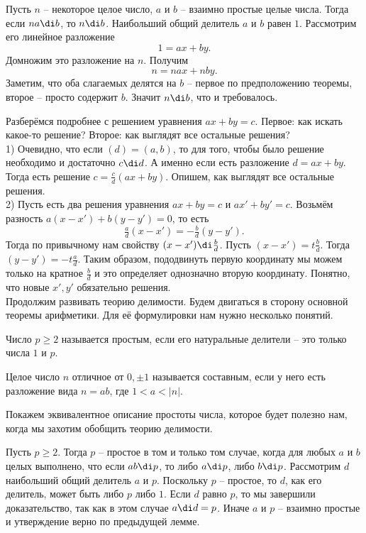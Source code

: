 \lm Пусть $n$ -- некоторое целое число, $a$ и $b$ -- взаимно простые целые числа. Тогда если $na \di b$, то $n\di b$.
\elm
\proof Наибольший общий делитель $a$  и $b$ равен $1$. Рассмотрим его линейное разложение 
$$1=ax+by.$$
Домножим это разложение на $n$. Получим $$n=nax+nby.$$
Заметим, что оба слагаемых делятся на $b$ -- первое по предположению теоремы, второе -- просто содержит $b$. Значит $n \di b$, что и требовалось.
\endproof

Разберёмся подробнее с решением уравнения $ax+by=c$. Первое: как искать какое-то решение? Второе: как выглядят все остальные решения?\\
1) Очевидно, что если $(d)=(a,b)$, то для того, чтобы было решение необходимо и достаточно $c\di d$. А именно если есть разложение $d=ax+by$. Тогда есть решение $c= \frac{c}{d}(ax+by)$. Опишем, как выглядят все остальные решения.\\
2) Пусть есть два решения уравнения $ax+by=c$ и $ax'+by'=c$. Возьмём разность $a(x-x')+b(y-y')=0$, то есть 
$$\tfrac{a}{d}(x-x')=-\tfrac{b}{d}(y-y').$$
Тогда по привычному нам свойству $(x-x')\di \frac{b}{d}$. Пусть $(x-x')=t\frac{b}{d}$. Тогда $(y-y')=-t\frac{a}{d}$. Таким образом, пододвинуть первую координату мы можем только на кратное $\frac{b}{d}$ и это определяет однозначно вторую координату. Понятно, что новые $x',y'$ обязательно решения.\\





Продолжим развивать теорию делимости. Будем двигаться в сторону основной теоремы арифметики. Для её формулировки нам нужно несколько понятий.

 Число $p\geq 2$ называется простым, если его натуральные делители -- это только числа $1$ и $p$.
\edfn

\rm Целое число $n$ отличное от $0,\pm 1$ называется составным, если у него есть разложение вида $n=ab$, где $1<a<|n|$.
\erm

Покажем эквивалентное описание простоты числа, которое будет полезно нам, когда мы захотим обобщить теорию делимости. 

\lm Пусть $p\geq 2$. Тогда $p$ -- простое в том и  только том случае, когда для любых $a$ и $b$ целых выполнено, что если $ab \di p$, то либо $a \di p$, либо $b\di p$.
\proof Рассмотрим $d$ наибольший общий делитель $a$ и  $p$. Поскольку $p$ -- простое, то $d$, как его делитель, может быть либо $p$ либо $1$. Если $d$ равно $p$, то мы завершили доказательство, так как в этом случае $a \di d =p$. Иначе $a$  и $p$ -- взаимно простые и утверждение верно по предыдущей лемме.

